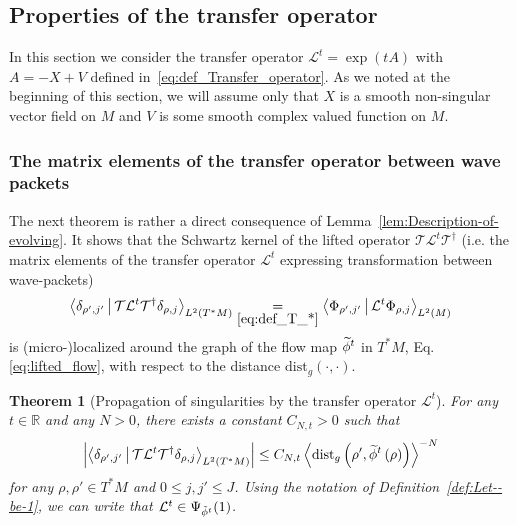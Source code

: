 \documentclass[10pt]{amsart}
\newtheorem{theo}{Theorem}[section]
\theoremstyle{definition}\newtheorem{defi}[theo]{Definition}\newtheorem{rema}[theo]{Remark}\newtheorem{exam}[theo]{Example}\newtheorem{exem}[theo]{Example}\newtheorem{nota}[theo]{Notation}
\newcommand{\clT}{\mathcal{T}}
\newcommand{\clL}{\mathcal{L}}
\newcommand{\dist}{\mathrm{dist}}
\newcommand{\bbR}{\mathbb{R}}
\let\oldtilde\tilde
\renewcommand*{\tilde}[1]{\mathchoice{\widetilde{#1}}{\widetilde{#1}}{\oldtilde{#1}}{\oldtilde{#1}}}
\begin{document}
\subsection{Properties of the transfer operator}

In this section we consider the transfer operator $\clL^{t}=\exp(tA)$ with $A=-X+V$ defined in~\eqref{eq:def_Transfer_operator}. As we noted at the beginning of this section, we will assume only that $X$ is a smooth non-singular vector field on $M$ and $V$ is some smooth complex valued function on $M$.

\subsubsection{The matrix elements of the transfer operator between wave packets}\label{subsec:A-matrix-elements}

The next theorem is rather a direct consequence of Lemma~\ref{lem:Description-of-evolving}. It shows that the Schwartz kernel of the lifted operator $\clT\clL^{t}\clT^{\dagger}$ (i.e. the matrix elements of the transfer operator $\clL^{t}$ expressing transformation between wave-packets)
\begin{equation}\label{eq:Schwartz_kernel_transfer_op}
\left\langle\delta_{\rho',j'}\,\middle|\,\clT\clL^{t}\clT^{\dagger}\delta_{\rho,j}\right\rangle_{L^{2}\left(T^{*}M\right)}\underset{\eqref{eq:def_T_*}}{=}\left\langle\Phi_{\rho',j'}\,\middle|\,\clL^{t}\Phi_{\rho,j}\right\rangle_{L^{2}\left(M\right)}
\end{equation}
is (micro-)localized around the graph of the flow map $\tilde{\phi}^{t}$ in $T^{*}M$, Eq.\eqref{eq:lifted_flow}, with respect to the distance $\dist_{g}\left(\cdot,\cdot\right)$.

\begin{cBoxB}{}
\begin{theo}[Propagation of singularities by the transfer operator $\clL^{t}$]\label{thm:Microlocality-of-the_TO}
For any $t\in\bbR$ and any $N>0$, there exists a constant $C_{N,t}>0$ such that
\begin{equation}\label{eq:microl_estimate}
\left|\left\langle\delta_{\rho',j'}\,\middle|\,\clT\clL^{t}\clT^{\dagger}\delta_{\rho,j}\right\rangle_{L^{2}\left(T^{*}M\right)}\right| \leq C_{N,t}\left\langle \dist_{g}\left(\rho',\tilde{\phi}^{t}\left(\rho\right)\right)\right\rangle ^{-N}
\end{equation}
for any $\rho,\rho'\in T^{*}M$ and $0\leq j,j'\leq J$. Using the notation of Definition~\ref{def:Let--be-1}, we can write that $\clL^{t}\in\Psi_{\tilde{\phi}^{t}}(1)$.
\end{theo}
\end{cBoxB}
\end{document}
